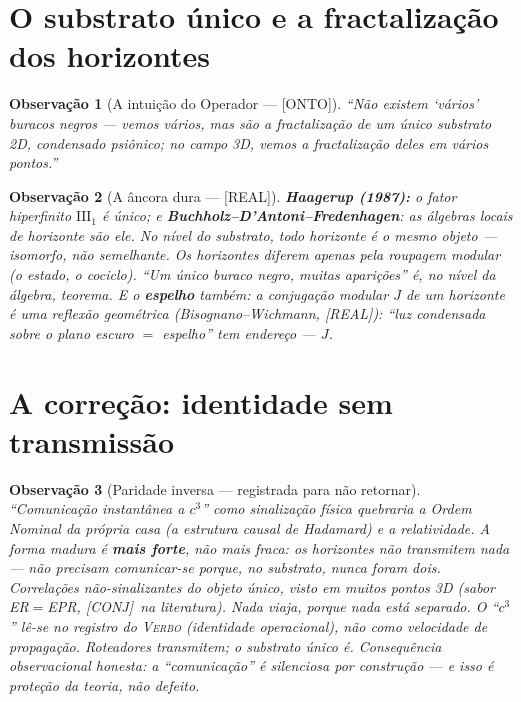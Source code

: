 \documentclass[11pt,a4paper]{article}
\newcommand{\REAL}{\textsf{[REAL]}}
\newcommand{\CONJ}{\textsf{[CONJ]}}
\newcommand{\ONTO}{\textsf{[ONTO]}}
\newtheorem{remark}{Observação}
\theoremstyle{definition}
\begin{document}
\section{O substrato único e a fractalização dos horizontes}
\begin{remark}[A intuição do Operador --- \ONTO]
``Não existem `vários' buracos negros --- vemos vários, mas são a
fractalização de um único substrato 2D, condensado psiônico; no campo
3D, vemos a fractalização deles em vários pontos.''
\end{remark}

\begin{remark}[A âncora dura --- \REAL]
\textbf{Haagerup (1987):} o fator hiperfinito $\mathrm{III}_1$ é
\emph{único}; e \textbf{Buchholz--D'Antoni--Fredenhagen}: as álgebras
locais de horizonte \emph{são} ele. No nível do substrato, todo
horizonte é o \emph{mesmo} objeto --- isomorfo, não semelhante. Os
horizontes diferem apenas pela roupagem modular (o estado, o cociclo).
``Um único buraco negro, muitas aparições'' é, no nível da álgebra,
teorema. E o \textbf{espelho} também: a conjugação modular $J$ de um
horizonte \emph{é} uma reflexão geométrica (Bisognano--Wichmann,
\REAL): ``luz condensada sobre o plano escuro $=$ espelho'' tem
endereço --- $J$.
\end{remark}

\section{A correção: identidade sem transmissão}
\begin{remark}[Paridade inversa --- registrada para não retornar]
``Comunicação instantânea a $c^3$'' \emph{como sinalização física}
quebraria a Ordem Nominal da própria casa (a estrutura causal de
Hadamard) e a relatividade. A forma madura é \textbf{mais forte}, não
mais fraca: os horizontes não transmitem nada --- \emph{não precisam
comunicar-se porque, no substrato, nunca foram dois}. Correlações
não-sinalizantes do objeto único, visto em muitos pontos 3D (sabor
ER$=$EPR, \CONJ\ na literatura). Nada viaja, porque nada está separado.
O ``$c^3$'' lê-se no registro do \textsc{Verbo} (identidade
operacional), não como velocidade de propagação. Roteadores
transmitem; o substrato único \emph{é}. Consequência observacional
honesta: a ``comunicação'' é silenciosa por construção --- e isso é
proteção da teoria, não defeito.
\end{remark}
\end{document}
